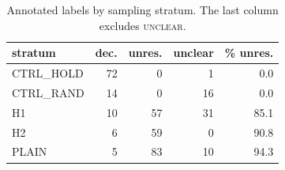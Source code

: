 \begin{table}[t]
\centering\small
\begin{tabular}{lrrrr}
\toprule
stratum & dec. & unres. & unclear & \% unres. \\
\midrule
CTRL\_HOLD & 72 & 0 & 1 & 0.0 \\
CTRL\_RAND & 14 & 0 & 16 & 0.0 \\
H1 & 10 & 57 & 31 & 85.1 \\
H2 & 6 & 59 & 0 & 90.8 \\
PLAIN & 5 & 83 & 10 & 94.3 \\
\bottomrule
\end{tabular}
\caption{Annotated labels by sampling stratum. The last column excludes \textsc{unclear}.}
\label{tab:stratum}
\end{table}
